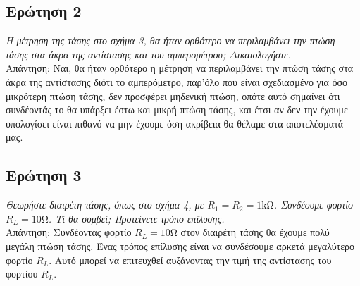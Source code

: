 \documentclass{article}
\begin{document}
\subsection{Ερώτηση 2}
\textit{Η μέτρηση της τάσης στο σχήμα 3, θα ήταν ορθότερο να περιλαμβάνει την πτώση
τάσης στα άκρα της αντίστασης και του αμπερομέτρου; Δικαιολογήστε.} \\

Απάντηση: Ναι, θα ήταν ορθότερο η μέτρηση να περιλαμβάνει την πτώση τάσης στα άκρα
της αντίστασης διότι το αμπερόμετρο, παρ'όλο που είναι σχεδιασμένο για όσο μικρότερη
πτώση τάσης, δεν προσφέρει μηδενική πτώση, οπότε αυτό σημαίνει ότι συνδέοντάς το θα
υπάρξει έστω και μικρή πτώση τάσης, και έτσι αν δεν την έχουμε υπολογίσει
είναι πιθανό να μην έχουμε όση ακρίβεια θα θέλαμε στα αποτελέσματά μας.

\subsection{Ερώτηση 3}
\textit{Θεωρήστε διαιρέτη τάσης, όπως στο σχήμα 4, με $R_1 = R_2 = \si{1\kohm}$.
Συνδέουμε φορτίο $R_L = \si{10\ohm}$. Τί θα συμβεί; Προτείνετε τρόπο επίλυσης.} \\

Απάντηση: Συνδέοντας φορτίο $R_L = \si{10\ohm}$ στον διαιρέτη τάσης \cite{harvard}
θα έχουμε πολύ μεγάλη πτώση τάσης. Ένας τρόπος επίλυσης είναι να συνδέσουμε αρκετά
μεγαλύτερο φορτίο $R_L$. Αυτό μπορεί να επιτευχθεί αυξάνοντας την τιμή της αντίστασης
του φορτίου $R_L$.

\renewcommand\refname{Πηγές}
\printbibliography
\end{document}
